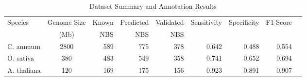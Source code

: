 \begin{table}[htbp]
\centering
\caption{Dataset Summary and Annotation Results}
\label{tab:dataset_summary}
\begin{tabular}{lcrrrrrrr}
\hline
Species & Genome Size & Known & Predicted & Validated & Sensitivity & Specificity & F1-Score \\
        & (Mb)        & NBS   & NBS       & NBS       &             &             &          \\
\hline
C. annuum & 2800 & 589 & 775 & 378 & 0.642 & 0.488 & 0.554 \\
O. sativa & 380 & 483 & 549 & 358 & 0.741 & 0.652 & 0.694 \\
A. thaliana & 120 & 169 & 175 & 156 & 0.923 & 0.891 & 0.907 \\
\hline
\end{tabular}
\end{table}
